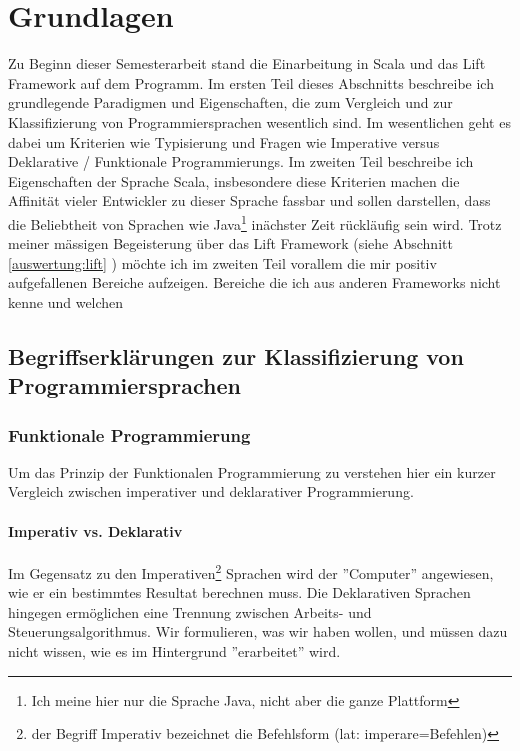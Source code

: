\chapter{Grundlagen}\label{grundlagen}
Zu Beginn dieser Semesterarbeit stand die Einarbeitung in Scala und das Lift Framework auf dem Programm. Im ersten Teil dieses Abschnitts beschreibe ich grundlegende Paradigmen und Eigenschaften, die zum Vergleich und zur Klassifizierung von Programmiersprachen wesentlich sind.  Im wesentlichen geht es dabei um Kriterien wie Typisierung und Fragen wie Imperative versus Deklarative / Funktionale Programmierungs.  Im zweiten Teil beschreibe ich Eigenschaften der Sprache Scala, insbesondere diese Kriterien machen die Affinit\"at vieler Entwickler zu dieser Sprache  fassbar und sollen darstellen, dass die Beliebtheit von Sprachen wie Java\footnote{Ich meine hier nur die Sprache Java, nicht aber die ganze Plattform} in\"achster Zeit r\"uckl\"aufig sein wird. Trotz meiner m\"assigen Begeisterung \"uber das Lift Framework (siehe Abschnitt \ref{auswertung:lift} ) m\"ochte ich im zweiten Teil vorallem die mir positiv aufgefallenen Bereiche aufzeigen. Bereiche die ich aus anderen Frameworks nicht kenne und welchen 

\section{Begriffserkl\"arungen zur Klassifizierung von Programmiersprachen}
 \subsection{Funktionale Programmierung}
Um das Prinzip der Funktionalen Programmierung zu verstehen hier ein kurzer Vergleich zwischen imperativer und deklarativer Programmierung.
\subsubsection{Imperativ vs. Deklarativ}\label{imperativ-deklarativ}
Im Gegensatz zu den Imperativen\footnote{der Begriff Imperativ bezeichnet die Befehlsform (lat: imperare=Befehlen)} Sprachen wird der ''Computer'' angewiesen, wie er ein bestimmtes Resultat berechnen muss. Die Deklarativen Sprachen hingegen erm\"oglichen eine Trennung zwischen Arbeits- und Steuerungsalgorithmus. Wir formulieren, was wir haben wollen, und m\"ussen dazu nicht wissen, wie es im Hintergrund ''erarbeitet'' wird.

